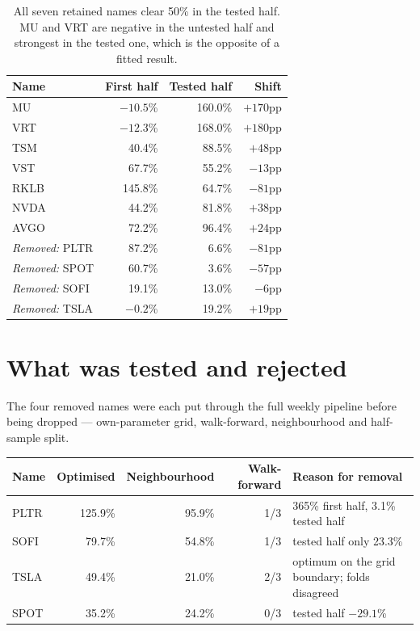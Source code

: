 \documentclass[11pt]{article}
\begin{document}
\begin{table}[H]\centering\small
\begin{tabular}{lrrr}
\toprule
\textbf{Name} & \textbf{First half} & \textbf{Tested half} & \textbf{Shift}\\
\midrule
\rowcolor{bckeep} MU   & $-10.5$\% & 160.0\% & $+170$pp\\
VRT  & $-12.3$\% & 168.0\% & $+180$pp\\
\rowcolor{bckeep} TSM  & 40.4\%  & 88.5\%  & $+48$pp\\
VST  & 67.7\%  & 55.2\%  & $-13$pp\\
\rowcolor{bckeep} RKLB & 145.8\% & 64.7\%  & $-81$pp\\
NVDA & 44.2\%  & 81.8\%  & $+38$pp\\
\rowcolor{bckeep} AVGO & 72.2\%  & 96.4\%  & $+24$pp\\
\midrule
\rowcolor{bcwarn} \textit{Removed:} PLTR & 87.2\% & 6.6\% & $-81$pp\\
\rowcolor{bcwarn} \textit{Removed:} SPOT & 60.7\% & 3.6\% & $-57$pp\\
\rowcolor{bcwarn} \textit{Removed:} SOFI & 19.1\% & 13.0\% & $-6$pp\\
\rowcolor{bcwarn} \textit{Removed:} TSLA & $-0.2$\% & 19.2\% & $+19$pp\\
\bottomrule
\end{tabular}
\caption{All seven retained names clear 50\% in the tested half. MU and VRT are negative in the
untested half and strongest in the tested one, which is the opposite of a fitted result.}
\end{table}

\section{What was tested and rejected}

The four removed names were each put through the full weekly pipeline before being dropped ---
own-parameter grid, walk-forward, neighbourhood and half-sample split.

\begin{table}[H]\centering\small
\begin{tabular}{lrrrl}
\toprule
\textbf{Name} & \textbf{Optimised} & \textbf{Neighbourhood} & \textbf{Walk-forward} &
\textbf{Reason for removal}\\
\midrule
\rowcolor{bcwarn} PLTR & 125.9\% & 95.9\% & 1/3 & 365\% first half, 3.1\% tested half\\
SOFI & 79.7\%  & 54.8\% & 1/3 & tested half only 23.3\%\\
\rowcolor{bcwarn} TSLA & 49.4\%  & 21.0\% & 2/3 & optimum on the grid boundary; folds disagreed\\
SPOT & 35.2\%  & 24.2\% & 0/3 & tested half $-29.1$\%\\
\bottomrule
\end{tabular}
\end{table}
\end{document}

